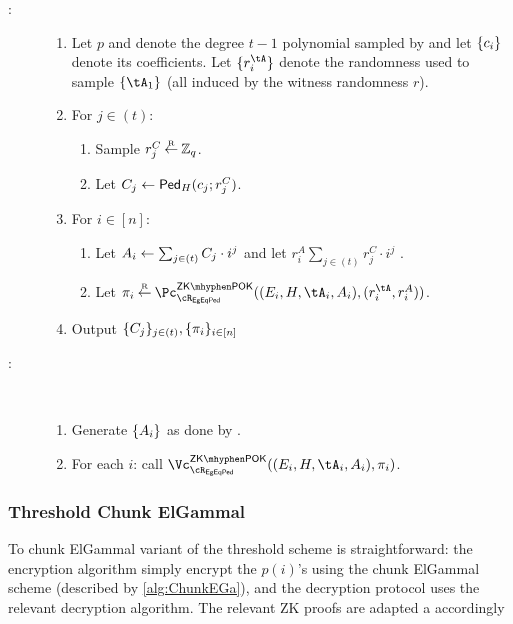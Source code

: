 {\begin{description}
\begin{description}
	\item[\Pc:]   

	\begin{enumerate}
	\item Let $p$  and denote the degree $t-1$ polynomial  sampled by \tsEgEnc and let $\{c_i\}$ denote its coefficients.   Let $\sset{r_i^{\tA}}$ denote the  randomness used to sample $\set{\tA_1}$  (all induced by the  witness randomness $r$).
	
	
	\item For $j\in (t)$: 
	
	\begin{enumerate}
		\item Sample  $r^C_j\mathbin{\stackrel{\mbox{\tiny R}}{\leftarrow}} {\mathbb Z}_q$.
		
		\item Let $C_j \leftarrow \mathsf{Ped}_{H}(c_j;r^C_j)$.
		
	\end{enumerate}
	
	\item  For $i \in [n]$: 
	
	
	\begin{enumerate}
		\item  Let $A_i \leftarrow  \sum_{j\in (t)} C_j  \cdot i^j$ and let $r_i^A  \sum_{j\in (t)} r^C_j  \cdot i^j$ . 
		
	
		\item Let $\pi_i \getsr \pZKPOK{\rEgEqPed}((E_i,H,\tA_i,A_i),(r_i^{\tA},r_i^A))$.
	\end{enumerate}
	
	\item Output $\{C_j\}_{j\in (t)},\{\pi_i\}_{i\in [n]}$
\end{enumerate}


\item[\Vc:]   ~

\begin{enumerate}
	
	\item Generate   $\set{A_i}$ as done by \Pc.
	
	\item For each $i$: call $\vZKPOK{\rEgEqPed}((E_i,H,\tA_i,A_i),\pi_i)$.
\end{enumerate}
\end{description}
\end{description}

\subsubsection{Threshold   Chunk ElGammal}
To chunk ElGammal  variant of the threshold scheme is straightforward: the encryption algorithm simply encrypt the $p(i)$'s using the  chunk ElGammal scheme (described by \cref{alg:ChunkEGa}), and the decryption protocol uses the relevant decryption algorithm.  The relevant ZK proofs are adapted a accordingly

}
